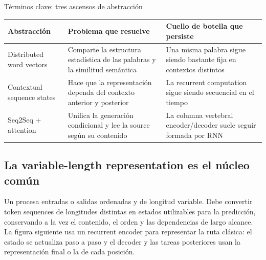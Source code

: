 
\begin{knowledgebox}{Términos clave: tres ascensos de abstracción}
\begin{tabularx}{\textwidth}{@{}L{0.20\textwidth}X X@{}}
\toprule
Abstracción & Problema que resuelve & Cuello de botella que persiste \\
\midrule
Distributed word vectors & Comparte la estructura estadística de las palabras y la similitud semántica & Una misma palabra sigue siendo bastante fija en contextos distintos \\
Contextual sequence states & Hace que la representación dependa del contexto anterior y posterior & La recurrent computation sigue siendo secuencial en el tiempo \\
Seq2Seq + attention & Unifica la generación condicional y lee la source según su contenido & La columna vertebral encoder/decoder suele seguir formada por RNN \\
\bottomrule
\end{tabularx}
\end{knowledgebox}


\subsection{La variable-length representation es el núcleo común}

Un  procesa entradas o salidas ordenadas y de longitud variable. Debe convertir token sequences de longitudes distintas en estados utilizables para la predicción, conservando a la vez el contenido, el orden y las dependencias de largo alcance. La figura siguiente usa un recurrent encoder para representar la ruta clásica: el estado se actualiza paso a paso y el decoder y las tareas posteriores usan la representación final o la de cada posición.


